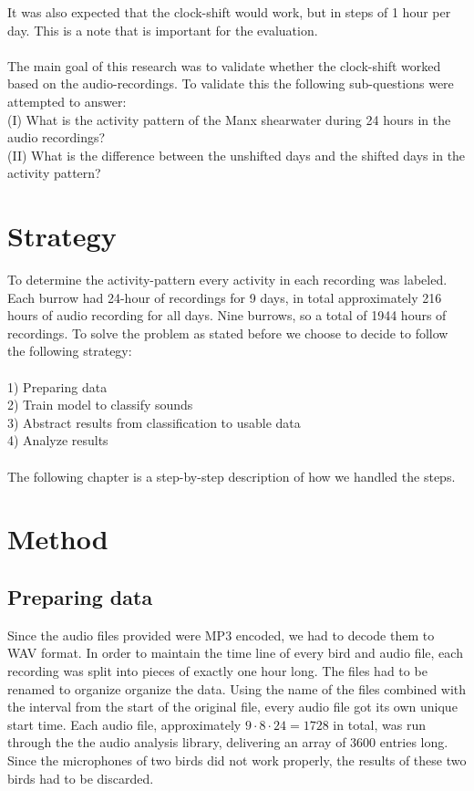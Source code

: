 \documentclass[a4paper]{article}
\begin{document}
It was also expected that the clock-shift would work, but in steps of 1 hour per day. This is a note that is important for the evaluation.\\\\
The main goal of this research was to validate whether the clock-shift worked based on the audio-recordings. To validate this the following sub-questions were attempted to answer:\\
 (I)    What is the activity pattern of the Manx shearwater during 24 hours in the audio recordings? \\
 (II)   What is the difference between the unshifted days and the shifted days in the activity pattern?
 
\section*{Strategy}
To determine the activity-pattern every activity in each recording was labeled. Each burrow had 24-hour of recordings for 9 days, in total approximately 216 hours of audio recording for all days. Nine burrows, so a total of 1944 hours of recordings. To solve the problem as stated before we choose to decide to follow the following strategy:\\\\
1) Preparing data \\
2) Train model to classify sounds\\
3) Abstract results from classification to usable data\\
4) Analyze results\\\\
The following chapter is a step-by-step description of how we handled the steps. 
\section*{Method}

\subsection*{Preparing data }

Since the audio files provided were MP3 encoded, we had to decode them to WAV format. In order to maintain the time line of every bird and audio file, each recording was split into pieces of exactly one hour long. The files had to be renamed to organize organize the data. Using the name of the files combined with the interval from the start of the original file, every audio file got its own unique start time. Each audio file, approximately $9\cdot8\cdot24=1728$ in total, was run through the the audio analysis library, delivering an array of 3600 entries long. Since the microphones of two birds did not work properly, the results of these two birds had to be discarded. 
\end{document}
